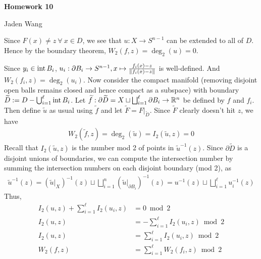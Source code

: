\documentclass[12pt]{article}
\begin{document}
\centerline {\textsf{\textbf{\LARGE{Homework 10}}}}
\centerline {Jaden Wang}
\vspace{.15in}

\begin{problem}[2.5.1]
Since $ F(x)\neq z \ \forall \ x \in D$, we see that $ u:X \to S^{n-1}$ can be extended to all of $ D$. Hence by the boundary theorem,  $ W_2(f,z) = \deg_2(u) = 0$.
\end{problem}

\begin{problem}[2.5.2]
Since $ y_i \in \operatorname{int} B_i$, $ u_i: \partial B_i \to S^{n-1}, x\mapsto \frac{f_i(x)-z}{{\left\lVert{ f_i(x)-z}\right\rVert}}$ is well-defined. And $ W_2(f_i,z) = \deg_2(u_i)$. Now consider the compact manifold (removing disjoint open balls remains closed and hence compact as a subspace) with boundary $ \widetilde{ D} := D - \bigcup_{ i= 1}^{\ell} \operatorname{int} B_i$. Let $ \widetilde{ f}: \partial \widetilde{ D} = X \sqcup \bigsqcup_{ i=1}^{\ell} \partial B_i \to \mathbb{R}^{n}$ be defined by $ f$ and  $ f_i$. Then define $ \widetilde{ u}$ as usual using $ \widetilde{ f}$ and let $ \widetilde{ F} = F|_{\widetilde{ D}}$. Since $ \widetilde{ F}$ clearly doesn't hit $ z$, we have
\begin{align*}
	W_2(\widetilde{ f},z) = \deg_2(\widetilde{ u}) = I_2(\widetilde{ u},z)=0
\end{align*}
Recall that $  I_2(\widetilde{ u},z)$ is the number mod 2 of points in $ \widetilde{ u}^{-1} (z)$. Since  $ \partial \widetilde{ D}$ is a disjoint unions of boundaries, we can compute the intersection number by summing the intersection numbers on each disjoint boundary (mod 2), as 
\begin{align*}
 \widetilde{ u}^{-1}(z) = (\widetilde{ u}|_{X})^{-1}(z) \sqcup \bigsqcup_{ i=1}^{n} (\widetilde{ u}|_{\partial B_i})^{-1}(z) = u^{-1}(z) \sqcup \bigsqcup_{ i=1}^{\ell} u_i^{-1}(z)
\end{align*}
Thus,
\begin{align*}
	I_2(u,z) + \sum_{ i= 1}^{ \ell} I_2(u_i,z) &= 0 \bmod 2\\ 
	I_2(u,z)&=  - \sum_{ i= 1}^{ \ell} I_2(u_i,z)  \bmod 2\\
	I_2(u,z) &= \sum_{ i= 1}^{ \ell}I_2(u_i,z)  \bmod 2\\
	W_2(f,z) &= \sum_{ i= 1}^{ \ell}W_2(f_i,z)  \bmod 2
\end{align*}
\end{problem}
\end{document}
